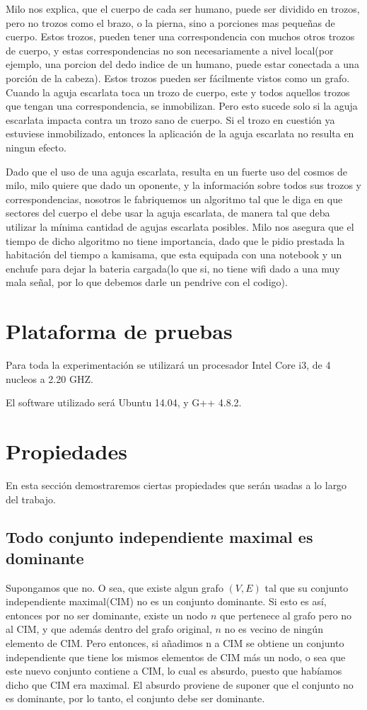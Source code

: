 \documentclass[a4paper]{article}
\begin{document}
\begin{enumerate}
Milo nos explica, que el cuerpo de cada ser humano, puede ser dividido en trozos, pero no trozos como el brazo, o la pierna, sino a porciones mas pequeñas de cuerpo. Estos trozos, pueden tener una correspondencia con muchos otros trozos de cuerpo, y estas correspondencias no son necesariamente a nivel local(por ejemplo, una porcion del dedo indice de un humano, puede estar conectada a una porción de la cabeza). Estos trozos pueden ser fácilmente vistos como un grafo. Cuando la aguja escarlata toca un trozo de cuerpo, este y todos aquellos trozos que tengan una correspondencia, se inmobilizan. Pero esto sucede solo si la aguja escarlata impacta contra un trozo sano de cuerpo. Si el trozo en cuestión ya estuviese inmobilizado, entonces la aplicación de la aguja escarlata no resulta en ningun efecto.

Dado que el uso de una aguja escarlata, resulta en un fuerte uso del cosmos de milo, milo quiere que dado un oponente, y la información sobre todos sus trozos y correspondencias, nosotros le fabriquemos un algoritmo tal que le diga en que sectores del cuerpo el debe usar la aguja escarlata, de manera tal que deba utilizar la mínima cantidad de agujas escarlata posibles. Milo nos asegura que el tiempo de dicho algoritmo no tiene importancia, dado que le pidio prestada la habitación del tiempo a kamisama, que esta equipada con una notebook y un enchufe para dejar la bateria cargada(lo que si, no tiene wifi dado a una muy mala señal, por lo que debemos darle un pendrive con el codigo).


\end{enumerate} 

\section{Plataforma de pruebas}

Para toda la experimentación se utilizará un procesador Intel Core i3, de 4 nucleos a 2.20 GHZ.

El software utilizado será Ubuntu 14.04, y G++ 4.8.2.
\newpage
\section{Propiedades}
En esta sección demostraremos ciertas propiedades que serán usadas a lo largo del trabajo.

\subsection{ Todo conjunto independiente maximal es dominante}
Supongamos que no. O sea, que existe algun grafo $(V,E)$ tal que su conjunto independiente maximal(CIM) no es un conjunto dominante. Si esto es así, entonces por no ser dominante, existe un nodo $n$ que pertenece al grafo pero no al CIM, y que además dentro del grafo original, $n$ no es vecino de ningún elemento de CIM. Pero entonces, si añadimos n a CIM se obtiene un conjunto independiente que tiene los mismos elementos de CIM más un nodo, o sea que este nuevo conjunto contiene a CIM, lo cual es absurdo, puesto que habíamos dicho que CIM era maximal. El absurdo proviene de suponer que el conjunto no es dominante, por lo tanto, el conjunto debe ser dominante.
\end{document}
